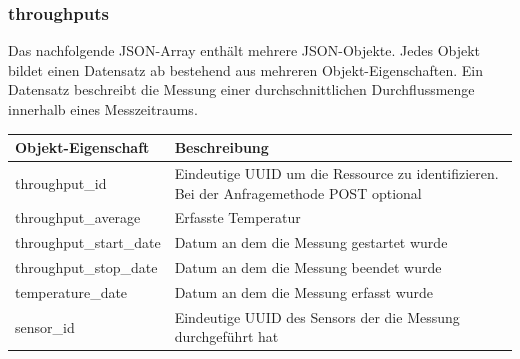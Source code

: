 \subsubsection{throughputs}%
\label{sec:rest.json.throughputs}

Das nachfolgende JSON-Array enthält mehrere JSON-Objekte. Jedes Objekt bildet
einen Datensatz ab bestehend aus mehreren Objekt-Eigenschaften. Ein Datensatz
beschreibt die Messung einer durchschnittlichen Durchflussmenge innerhalb eines
Messzeitraums.

\begin{jsoncode}
\end{jsoncode}

\begin{table}[H]
  \begin{tabularx}{\textwidth}{lX}
    \textbf{Objekt-Eigenschaft} & \textbf{Beschreibung}                                                                     \\ \toprule
    throughput\_id              & Eindeutige UUID um die Ressource zu identifizieren. Bei der Anfragemethode POST optional  \\
    throughput\_average         & Erfasste Temperatur                                                                       \\
    throughput\_start\_date     & Datum an dem die Messung gestartet wurde                                                  \\
    throughput\_stop\_date      & Datum an dem die Messung beendet wurde                                                    \\
    temperature\_date           & Datum an dem die Messung erfasst wurde                                                    \\
    sensor\_id                  & Eindeutige UUID des Sensors der die Messung durchgeführt hat                              \\
  \end{tabularx}
\end{table}


